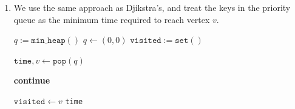 \documentclass[12pt]{article}
\begin{document}
\begin{enumerate}
\begin{algorithm}
\begin{algorithmic}
        \vspace{3mm}

        \State \Return $\texttt{as\_list}(\texttt{pred})$
        \EndProcedure
      \end{algorithmic}
    \end{algorithm}

    We prove that such an algorithm is correct, via contradiction.
    Assume that the path $p$ returned by our algorithm is incorrect.
    Let $\kappa(p)$ be the minimum edge weight of path $p,$ and let
    the path returned by our algorithm be $p,$ and a correct path be $p^\star.$

    Consider $e = [u, w],$ the edge in $p$ with weight $\kappa(p).$
    Since $c(e) = \kappa(p) < \kappa(p^\star),$ every edge in
    $p^\star$ has a higher priority, meaning we will never pop off
    edge $e$ from our priority queue until $p^\star$ has been
    traversed. However, this is a contradiction, since then our
    algorithm will assign $p^\star$ as our path from $s \to t.$

    Thus, the path $p$ returned must be one that maximizes $\kappa(p).$

    Since every edge is traversed once, and for every edge we push
    onto the priority queue of size $\mathcal O(|E|),$ the time
    complexity of this algorithm is $\mathcal O(|E| \log |E|).$

  \item We use the same approach as Djikstra's, and treat the keys in
    the priority queue as the minimum time required  to reach vertex $v.$

    \begin{algorithm}
      \caption{Delayed Djikstra's}
      \begin{algorithmic}
        \State $q := \texttt{min\_heap}()$
        \State $q \gets (0, 0)$
        \State $\texttt{visited} := \texttt{set}()$

        \vspace{3mm}

        \State $\texttt{time}, v \gets \texttt{pop}(q)$

        \State \textbf{continue}
        \EndIf

        \vspace{3mm}

        \State $\texttt{visited} \gets v$
        \State \Return \texttt{time}
        \EndIf


\end{algorithmic}
\end{algorithm}
\end{enumerate}
\end{document}

